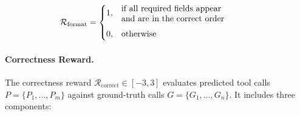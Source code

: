 \begin{equation*}
\mathcal{R}_{\text{format}} = 
\begin{cases}
1, & \vcenter{\hbox{\parbox{5.5cm}{if all required fields appear\\and are in the correct order}}} \vspace{8pt}\\
0, & \text{otherwise}
\end{cases}
\end{equation*}

\paragraph{Correctness Reward.} The correctness reward \( \mathcal{R}_{\text{correct}} \in [-3, 3] \) evaluates predicted tool calls \( P = \{P_1, ..., P_m\} \) against ground-truth calls \( G = \{G_1, ..., G_n\} \). It includes three components:

